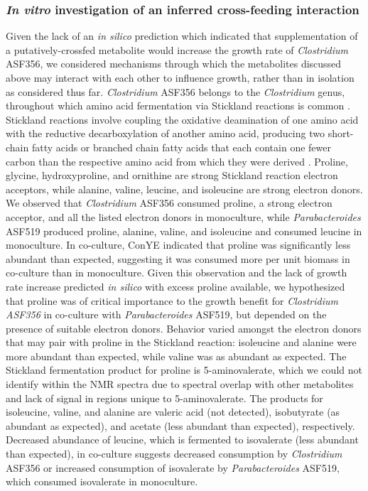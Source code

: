 \documentclass[11pt,onecolumn,notitlepage,openany,twoside]{book}
\begin{document}
\begin{refsection}
\subsubsection{\textit{In vitro} investigation of an inferred cross-feeding interaction}

Given the lack of an \textit{in silico} prediction which indicated that supplementation of a putatively-crossfed metabolite would increase the growth rate of \textit{Clostridium} ASF356, we considered mechanisms through which the metabolites discussed above may interact with each other to influence growth, rather than in isolation as considered thus far. \textit{Clostridium} ASF356 belongs to the \textit{Clostridium} genus, throughout which amino acid fermentation via Stickland reactions is common \cite{Mead1971-oa}. Stickland reactions involve coupling the oxidative deamination of one amino acid with the reductive decarboxylation of another amino acid, producing two short-chain fatty acids or branched chain fatty acids that each contain one fewer carbon than the respective amino acid from which they were derived \cite{Nisman1954-xl}. Proline, glycine, hydroxyproline, and ornithine are strong Stickland reaction electron acceptors, while alanine, valine, leucine, and isoleucine are strong electron donors. We observed that \textit{Clostridium} ASF356 consumed proline, a strong electron acceptor, and all the listed electron donors in monoculture, while \textit{Parabacteroides} ASF519 produced proline, alanine, valine, and isoleucine and consumed leucine in monoculture. In co-culture, ConYE indicated that proline was significantly less abundant than expected, suggesting it was consumed more per unit biomass in co-culture than in monoculture. Given this observation and the lack of growth rate increase predicted \textit{in silico} with excess proline available, we hypothesized that proline was of critical importance to the growth benefit for \textit{Clostridium ASF356} in co-culture with \textit{Parabacteroides} ASF519, but depended on the presence of suitable electron donors. Behavior varied amongst the electron donors that may pair with proline in the Stickland reaction: isoleucine and alanine were more abundant than expected, while valine was as abundant as expected. The Stickland fermentation product for proline is 5-aminovalerate, which we could not identify within the NMR spectra due to spectral overlap with other metabolites and lack of signal in regions unique to 5-aminovalerate. The products for isoleucine, valine, and alanine are valeric acid (not detected), isobutyrate (as abundant as expected), and acetate (less abundant than expected), respectively. Decreased abundance of leucine, which is fermented to isovalerate (less abundant than expected), in co-culture suggests decreased consumption by \textit{Clostridium} ASF356 or increased consumption of isovalerate by \textit{Parabacteroides} ASF519, which consumed isovalerate in monoculture.


\end{refsection}
\end{document}
